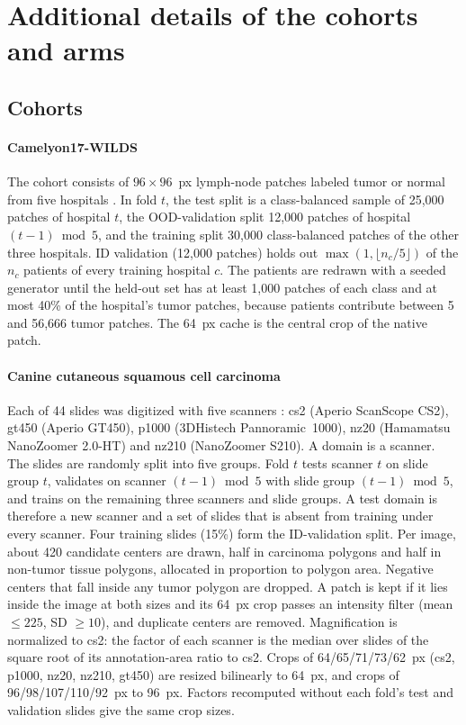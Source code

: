 \section{Additional details of the cohorts and arms}
\label{sup:setup}

\subsection{Cohorts}
\label{sup:cohorts}

\paragraph{Camelyon17-WILDS} The cohort consists of $96\times96$~px
lymph-node patches labeled tumor or normal from five hospitals
\citep{koh2021wilds,bandi2019camelyon17}. In fold $t$, the test split is a
class-balanced sample of 25,000 patches of hospital $t$, the OOD-validation
split 12,000 patches of hospital $(t-1)\bmod5$, and the training split 30,000
class-balanced patches of the other three hospitals. ID validation (12,000
patches) holds out $\max(1,\lfloor n_c/5\rfloor)$ of the $n_c$ patients of
every training hospital $c$. The patients are redrawn with a seeded generator
until the held-out set has at least 1,000 patches of each class and at most
40\% of the hospital's tumor patches, because patients contribute between 5
and 56,666 tumor patches. The 64~px cache is the central crop of the native
patch.

\paragraph{Canine cutaneous squamous cell carcinoma} Each of 44 slides was
digitized with five scanners \citep{wilm2023canine}: cs2 (Aperio ScanScope
CS2), gt450 (Aperio GT450), p1000 (3DHistech Pannoramic~1000), nz20 (Hamamatsu
NanoZoomer 2.0-HT) and nz210 (NanoZoomer S210). A domain is a scanner. The
slides are randomly split into five groups. Fold $t$ tests scanner $t$ on slide
group $t$, validates on scanner $(t-1)\bmod5$ with slide group $(t-1)\bmod5$,
and trains on the remaining three scanners and slide groups. A test domain is
therefore a new scanner and a set of slides that is absent from training under
every scanner. Four training slides (15\%) form the ID-validation split. Per
image, about 420 candidate centers are drawn, half in carcinoma polygons and
half in non-tumor tissue polygons, allocated in proportion to polygon area. Negative centers that fall inside any tumor polygon
are dropped. A patch is kept if it lies inside the image at both sizes and its
64~px crop passes an intensity filter (mean $\le225$, SD $\ge10$), and
duplicate centers are removed. Magnification is normalized to cs2: the factor
of each scanner is the median over slides of the square root of its
annotation-area ratio to cs2. Crops of 64/65/71/73/62~px (cs2, p1000, nz20,
nz210, gt450) are resized bilinearly to 64~px, and crops of
96/98/107/110/92~px to 96~px. Factors recomputed without each fold's test and
validation slides give the same crop sizes.

